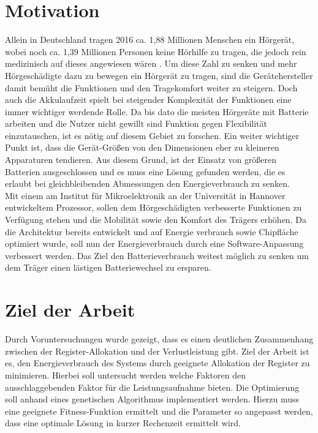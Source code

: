 \section{Motivation}
\label{sec:motivation}
Allein in Deutschland tragen 2016 ca. 1,88 Millionen Menschen ein Hörgerät, wobei noch ca. 1,39 Millionen Personen keine Hörhilfe zu tragen, die jedoch rein medizinisch auf dieses angewiesen wären \cite{statistica}. Um diese Zahl zu senken und mehr Hörgeschädigte dazu zu bewegen ein Hörgerät zu tragen, sind die Gerätehersteller damit bemüht die Funktionen und den Tragekomfort weiter zu steigern. Doch auch die Akkulaufzeit spielt bei steigender Komplexität der Funktionen eine immer wichtiger werdende Rolle. Da bis dato die meisten Hörgeräte mit Batterie arbeiten und die Nutzer nicht gewillt sind Funktion gegen Flexibilität einzutauschen, ist es nötig auf diesem Gebiet zu forschen. Ein weiter wichtiger Punkt ist, dass die Gerät-Größen von den Dimensionen eher zu kleineren Apparaturen tendieren. Aus diesem Grund, ist der Einsatz von größeren Batterien ausgeschlossen und es muss eine Lösung gefunden werden, die es erlaubt bei gleichbleibenden Abmessungen den Energieverbrauch zu senken.\\
Mit einem am Institut für Mikroelektronik an der Universität in Hannover entwickeltem Prozessor, sollen dem Hörgeschädigten verbesserte Funktionen zu Verfügung stehen und die Mobilität sowie den Komfort des Trägers erhöhen. Da die Architektur bereits entwickelt und auf Energie verbrauch sowie Chipfläche optimiert wurde, soll nun der Energieverbrauch durch eine Software-Anpassung verbessert werden.
Das Ziel den Batterieverbrauch weitest möglich zu senken um dem Träger einen lästigen Batteriewechsel zu ersparen.


\section{Ziel der Arbeit}
\label{sec:ziele}
Durch Voruntersuchungen wurde gezeigt, dass es einen deutlichen Zusammenhang zwischen der Register-Allokation und der Verlustleistung gibt. Ziel der Arbeit ist es, den Energieverbrauch des Systems durch geeignete Allokation der Register zu minimieren. Hierbei soll untersucht werden welche Faktoren den ausschlaggebenden Faktor für die Leistungsaufnahme bieten. Die Optimierung soll anhand eines genetischen Algorithmus implementiert werden. Hierzu muss eine geeignete Fitness-Funktion ermittelt und die Parameter so angepasst werden, dass eine optimale Lösung in kurzer Rechenzeit ermittelt wird.

